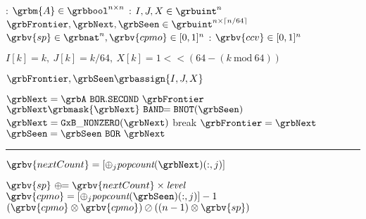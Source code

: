 \begin{algorithm}[htb]
	\footnotesize
	\caption{Bitwise all-source MSBFS algorithm. %
	\emph{Notation:} \textit{popcount} is a unary operator that counts the number of bits in an \grbuint{} value.
	Lines \ref*{alg:ccv-startline}--\ref*{alg:ccv-endline} compute the CCV (cf.~Alg.~\ref{alg:GraphBLAS:Query4}).
	}
	\label{alg:GraphBLAS:MSBFS:bitwise}
	\begin{algorithmic}[1]
		\Input: $\grbm{A} \in \grbbool^{n \times n}$
		\EndInput
		\Data:
			\State $I, J, X \in \grbuint^n$
			\State $\grbFrontier, \grbNext, \grbSeen \in \grbuint^{n \times \lceil n/64 \rceil}$
			\State $\grbv{sp} \in \grbnat^n, \grbv{cpmo} \in [0,1]^n$ 
		\EndData
		\Output: $\grbv{ccv} \in [0, 1]^n$ 
		\EndOutput

		 
			\State $I[k] = k, \ J[k] = k/64, \ X[k] = 1 <\!< (64-(k \mathrm{\ mod\ } 64))$
		\EndFor

		\State $\grbFrontier, \grbSeen \grbassign \{ I, J, X \}$

			\State $\grbNext = \grbA \mathtt{\ BOR.SECOND\ } \grbFrontier$
			\State $\grbNext\grbmask{\grbNext} \mathtt{\ BAND}\!\!= \texttt{BNOT}(\grbSeen)$
			\State $\grbNext = \mathtt{GxB\_NONZERO}(\grbNext)$ 
			 break \EndIf
			\State $\grbFrontier = \grbNext$
			\State $\grbSeen = \grbSeen \mathtt{\ BOR\ } \grbNext$
	
			\vspace{0.5ex}
			\hrule
			\vspace{0.5ex}

			\State \label{alg:ccv-startline}
			$\grbv{nextCount} = [{\oplus}_j \textit{popcount}(\grbNext)(:,j)]$

			\State
			$\grbv{sp} \ \oplus\!\!= \grbv{nextCount} \times \textit{level}$
		\EndFor
		\State $\grbv{cpmo} = [{\oplus}_j \textit{popcount}(\grbSeen)(:,j)] - 1$ 
		\State \Return $(\grbv{cpmo} \otimes \grbv{cpmo}) \oslash ((n-1) \otimes \grbv{sp})$ 
		\label{alg:ccv-endline}

		\EndProcedure
		\end{algorithmic}
\end{algorithm}
